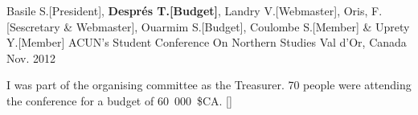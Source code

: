 \vspace{-8pt}
\begin{cventries}
\cventry
    {Basile S.[President], \textbf{Després T.[Budget]}, Landry
      V.[Webmaster], Oris, F.[Sescretary \& Webmaster], Ouarmim S.[Budget],
      Coulombe S.[Member] \& Uprety Y.[Member]}
    {ACUN's Student Conference On Northern Studies}
    {Val d'Or, Canada}
    {Nov. 2012}
    {
      \begin{cvitems}
      \item []{I was part of the organising committee  as the
          Treasurer. 70 people were attending the conference for a budget of 60~000~\$CA. {\href{http://www.uqat.ca/sce2012/?lang=en\&menu=home}{[}]}}
      \end{cvitems}
    }  
 \end{cventries}
